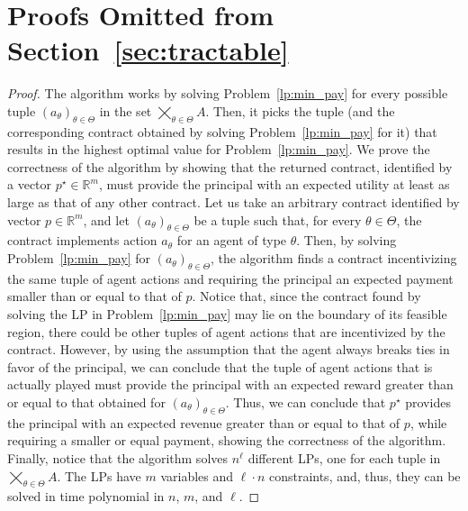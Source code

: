 \section{Proofs Omitted from Section~\ref{sec:tractable}}

\propositionTypes*

\begin{proof}
	The algorithm works by solving Problem~\eqref{lp:min_pay} for every possible tuple $\left( a_\theta \right)_{\theta \in \Theta}$ in the set $\bigtimes_{\theta \in \Theta} A$.
	Then, it picks the tuple (and the corresponding contract obtained by solving Problem~\eqref{lp:min_pay} for it) that results in the highest optimal value for Problem~\eqref{lp:min_pay}.
	We prove the correctness of the algorithm by showing that the returned contract, identified by a vector $ p^\star \in \mathbb{R}^m$, must provide the principal with an expected utility at least as large as that of any other contract.
	Let us take an arbitrary contract identified by vector $p \in \mathbb{R}^m$, and let $\left( a_\theta \right)_{\theta \in \Theta}$ be a tuple such that, for every $\theta \in \Theta$, the contract implements action $a_\theta$ for an agent of type $\theta$.
	Then, by solving Problem~\eqref{lp:min_pay} for $\left( a_\theta \right)_{\theta \in \Theta}$, the algorithm finds a contract incentivizing the same tuple of agent actions and requiring the principal an expected payment smaller than or equal to that of $p$.
	Notice that, since the contract found by solving the LP in Problem~\eqref{lp:min_pay} may lie on the boundary of its feasible region, there could be other tuples of agent actions that are incentivized by the contract.
	However, by using the assumption that the agent always breaks ties in favor of the principal, we can conclude that the tuple of agent actions that is actually played must provide the principal with an expected reward greater than or equal to that obtained for $\left( a_\theta \right)_{\theta \in \Theta}$.
	Thus, we can conclude that $p^\star$ provides the principal with an expected revenue greater than or equal to that of $p$, while requiring a smaller or equal payment, showing the correctness of the algorithm.
	Finally, notice that the algorithm solves $n^\ell$ different LPs, one for each tuple in $\bigtimes_{\theta \in \Theta} A$.
	The LPs have $m$ variables and $\ell \cdot n$ constraints, and, thus, they can be solved in time polynomial in $n$, $m$, and $\ell$.
\end{proof}



